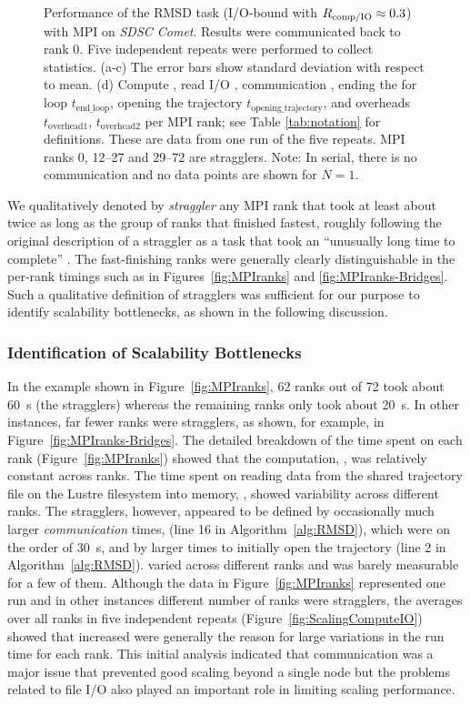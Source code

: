 \begin{figure}[!htb]
  \caption{Performance of the RMSD task (I/O-bound with $R_{\text{comp/IO}} \approx 0.3$) with MPI on \emph{SDSC Comet}.
    Results were communicated back to rank 0.
    Five independent repeats were performed to collect statistics.
    (a-c) The error bars show standard deviation with respect to mean.
    (d) Compute \tcomp, read I/O \tIO, communication \tcomm, ending the for loop $t_{\text{end\_loop}}$, opening the trajectory $t_{\text{opening\_trajectory}}$, and overheads $t_{\text{overhead1}}$, $t_{\text{overhead2}}$ per MPI rank; see Table \ref{tab:notation} for definitions.
    These are data from one run of the five repeats.
    MPI ranks 0, 12--27 and 29--72 are stragglers.
    Note: In serial, there is no communication and no data points are shown for $N=1$.}
  \label{fig:MPIwithIO}
\end{figure}

We qualitatively denoted by \emph{straggler} any MPI rank that took at least about twice as long as the group of ranks that finished fastest, roughly following the original description of a straggler as a task that took an ``unusually long time to complete'' \cite{Dean2004}.
The fast-finishing ranks were generally clearly distinguishable in the per-rank timings such as in Figures~\ref{fig:MPIranks} and \ref{fig:MPIranks-Bridges}.
Such a qualitative definition of stragglers was sufficient for our purpose to identify scalability bottlenecks, as shown in the following discussion.


\subsubsection*{Identification of Scalability Bottlenecks}

In the example shown in Figure~\ref{fig:MPIranks}, 62 ranks out of 72 took about 60~s (the stragglers) whereas the remaining ranks only took about 20~s.
In other instances, far fewer ranks were stragglers, as shown, for example, in Figure~\ref{fig:MPIranks-Bridges}.
The detailed breakdown of the time spent on each rank (Figure~\ref{fig:MPIranks}) showed that the computation, \tcomp, was relatively constant across ranks. 
The time spent on reading data from the shared trajectory file on the Lustre filesystem into memory, \tIO, showed variability across different ranks. 
The stragglers, however, appeared to be defined by occasionally much larger \emph{communication} times, \tcomm (line 16 in Algorithm~\ref{alg:RMSD}), which were on the order of 30~s, and by larger times to initially open the trajectory (line 2 in Algorithm~\ref{alg:RMSD}).
\tcomm varied across different ranks and was barely measurable for a few of them.
Although the data in Figure~\ref{fig:MPIranks} represented one run and in other instances different number of ranks were stragglers, the averages over all ranks in five independent repeats (Figure~\ref{fig:ScalingComputeIO}) showed that increased \tcomm were generally the reason for large variations in the run time for each rank.
This initial analysis indicated that communication was a major issue that prevented good scaling beyond a single node but the problems related to file I/O also played an important role in limiting scaling performance.


